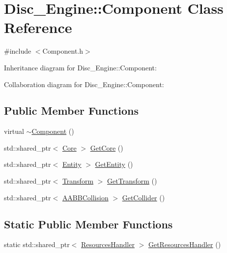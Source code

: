 \hypertarget{class_disc___engine_1_1_component}{}\section{Disc\+\_\+\+Engine\+:\+:Component Class Reference}
\label{class_disc___engine_1_1_component}


{\ttfamily \#include $<$Component.\+h$>$}



Inheritance diagram for Disc\+\_\+\+Engine\+:\+:Component\+:


Collaboration diagram for Disc\+\_\+\+Engine\+:\+:Component\+:
\subsection*{Public Member Functions}
\begin{DoxyCompactItemize}
\item 
virtual \mbox{\hyperlink{class_disc___engine_1_1_component_ab8378fa275af98e568a7e91d33d867af}{$\sim$\+Component}} ()
\item 
std\+::shared\+\_\+ptr$<$ \mbox{\hyperlink{class_disc___engine_1_1_core}{Core}} $>$ \mbox{\hyperlink{class_disc___engine_1_1_component_a601ec93559ca1dd75c2c1ea13510594d}{Get\+Core}} ()
\item 
std\+::shared\+\_\+ptr$<$ \mbox{\hyperlink{class_disc___engine_1_1_entity}{Entity}} $>$ \mbox{\hyperlink{class_disc___engine_1_1_component_a746298ddfd39da5b191926aa8d8f6d95}{Get\+Entity}} ()
\item 
std\+::shared\+\_\+ptr$<$ \mbox{\hyperlink{class_disc___engine_1_1_transform}{Transform}} $>$ \mbox{\hyperlink{class_disc___engine_1_1_component_a4a2388231ae4116b35ee75793868fda6}{Get\+Transform}} ()
\item 
std\+::shared\+\_\+ptr$<$ \mbox{\hyperlink{class_disc___engine_1_1_a_a_b_b_collision}{A\+A\+B\+B\+Collision}} $>$ \mbox{\hyperlink{class_disc___engine_1_1_component_ae902b61db2d9d70bdcf2fa45edbac131}{Get\+Collider}} ()
\end{DoxyCompactItemize}
\subsection*{Static Public Member Functions}
\begin{DoxyCompactItemize}
\item 
static std\+::shared\+\_\+ptr$<$ \mbox{\hyperlink{class_disc___engine_1_1_resources_handler}{Resources\+Handler}} $>$ \mbox{\hyperlink{class_disc___engine_1_1_component_ad89e191ceda9b1e3660dce8319ef73b4}{Get\+Resources\+Handler}} ()
\end{DoxyCompactItemize}
